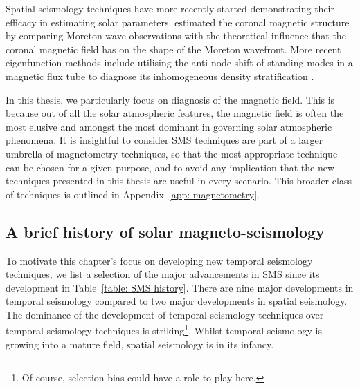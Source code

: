 \documentclass[12pt]{../style-files/ociamthesis}
\begin{document}
Spatial seismology techniques have more recently started demonstrating their efficacy in estimating solar parameters. \cite{uch70} estimated the coronal magnetic structure by comparing Moreton wave observations with the theoretical influence that the coronal magnetic field has on the shape of the Moreton wavefront. More recent eigenfunction methods include utilising the anti-node shift of standing modes in a magnetic flux tube to diagnose its inhomogeneous density stratification \citep{erd_etal07,ver_etal07,erd_etal14}.

In this thesis, we particularly focus on diagnosis of the magnetic field. This is because out of all the solar atmospheric features, the magnetic field is often the most elusive and amongst the most dominant in governing solar atmospheric phenomena. It is insightful to consider SMS techniques are part of a larger umbrella of magnetometry techniques, so that the most appropriate technique can be chosen for a given purpose, and to avoid any implication that the new techniques presented in this thesis are useful in every scenario. This broader class of techniques is outlined in Appendix~\ref{app: magnetometry}.


\subsection{A brief history of solar magneto-seismology} \label{sec: SMS history}

To motivate this chapter's focus on developing new temporal seismology techniques, we list a selection of the major advancements in SMS since its development in Table~\ref{table: SMS history}. There are nine major developments in temporal seismology compared to two major developments in spatial seismology. The dominance of the development of temporal seismology techniques over temporal seismology techniques is striking\footnote{Of course, selection bias could have a role to play here.}. Whilst temporal seismology is growing into a mature field, spatial seismology is in its infancy.
\end{document}
